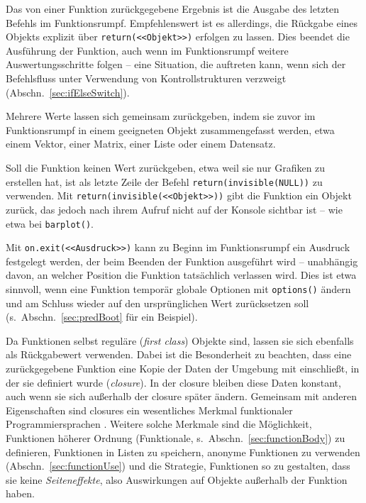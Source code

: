 Das von einer Funktion zurückgegebene Ergebnis ist die Ausgabe des letzten Befehls im Funktionsrumpf. Empfehlenswert ist es allerdings, die Rückgabe eines Objekts explizit über \lstinline!return(<<Objekt>>)! erfolgen zu lassen. Dies beendet die Ausführung der Funktion, auch wenn im Funktionsrumpf weitere Auswertungsschritte folgen -- eine Situation, die auftreten kann, wenn sich der Befehlsfluss unter Verwendung von Kontrollstrukturen verzweigt (Abschn.\ \ref{sec:ifElseSwitch}).

Mehrere Werte lassen sich gemeinsam zurückgeben, indem sie zuvor im Funktionsrumpf in einem geeigneten Objekt zusammengefasst werden, etwa einem Vektor, einer Matrix, einer Liste oder einem Datensatz.

Soll die Funktion keinen Wert zurückgeben, etwa weil sie nur Grafiken zu erstellen hat, ist als letzte Zeile der Befehl \lstinline!return(invisible(NULL))! zu verwenden. Mit \lstinline!return(invisible(<<Objekt>>))! gibt die Funktion ein Objekt zurück, das jedoch nach ihrem Aufruf nicht auf der Konsole sichtbar ist -- wie etwa bei \lstinline!barplot()!.

Mit \lstinline!on.exit(<<Ausdruck>>)! kann zu Beginn im Funktionsrumpf ein Ausdruck festgelegt werden, der beim Beenden der Funktion ausgeführt wird -- unabhängig davon, an welcher Position die Funktion tatsächlich verlassen wird. Dies ist etwa sinnvoll, wenn eine Funktion temporär globale Optionen mit \lstinline!options()! ändern und am Schluss wieder auf den ursprünglichen Wert zurücksetzen soll (s.\ Abschn.\ \ref{sec:predBoot} für ein Beispiel).

Da Funktionen selbst reguläre (\emph{first class}) Objekte sind, lassen sie sich ebenfalls als Rückgabewert verwenden. Dabei ist die Besonderheit zu beachten, dass eine zurückgegebene Funktion eine Kopie der Daten der Umgebung mit einschließt, in der sie definiert wurde (\emph{closure}). In der closure bleiben diese Daten konstant, auch wenn sie sich außerhalb der closure später ändern. Gemeinsam mit anderen Eigenschaften sind closures ein wesentliches Merkmal funktionaler Programmiersprachen . Weitere solche Merkmale sind die Möglichkeit, Funktionen höherer Ordnung (Funktionale, s.\ Abschn.\ \ref{sec:functionBody}) zu definieren, Funktionen in Listen zu speichern, anonyme Funktionen zu verwenden (Abschn.\ \ref{sec:functionUse}) und die Strategie, Funktionen so zu gestalten, dass sie keine \emph{Seiteneffekte}, also Auswirkungen auf Objekte außerhalb der Funktion haben.

